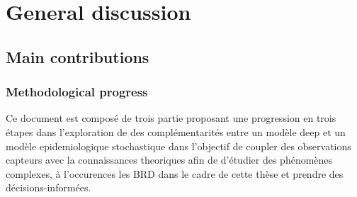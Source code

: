 
\chapter{General discussion} %


\section{Main contributions}
\subsection{Methodological progress}

Ce document est composé de trois partie proposant une progression en trois étapes dans l'exploration de des complémentarités entre un modèle deep et un modèle epidemiologique stochastique dans l'objectif de coupler des observations capteurs avec la connaissances theoriques afin de d'étudier des phénomènes complexes, à l'occurences les BRD dans le cadre de cette thèse et prendre des décisions-informées.



